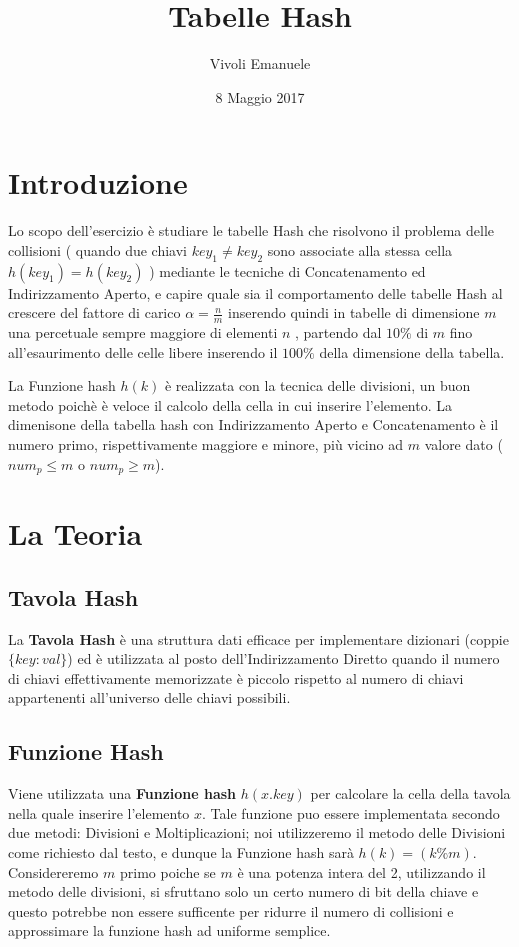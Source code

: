 \documentclass{article}
\title{Tabelle Hash}
\author{Vivoli Emanuele }
\date{8 Maggio 2017}
\makeatletter
\renewcommand\tableofcontents{%
    \@starttoc{toc}%
}
\makeatother
\begin{document}
\maketitle
\vspace*{0.33\textheight}
\tableofcontents

\newpage
\section{Introduzione}
Lo scopo dell'esercizio è studiare  le tabelle Hash che risolvono il problema delle collisioni ( quando due chiavi $key_1 \neq key_2$ sono associate alla stessa cella $h(key_1) = h(key_2)$ ) mediante le tecniche di Concatenamento ed Indirizzamento Aperto, e capire quale sia il comportamento delle tabelle Hash al crescere del fattore di carico $\alpha=\frac{n}{m}$ inserendo quindi in tabelle di dimensione $m$ una percetuale sempre maggiore di elementi $n$ , partendo dal $10\%$ di $m$ fino all'esaurimento delle celle libere inserendo il $100\%$ della dimensione della tabella.

La Funzione hash $h(k)$  è realizzata con la tecnica delle divisioni, un buon metodo poichè è veloce il calcolo della cella in cui inserire l'elemento.
La dimenisone della tabella hash con Indirizzamento Aperto e Concatenamento è il numero primo, rispettivamente maggiore e minore, più vicino ad $m$ valore dato ($num_p \leq m$ o $num_p \geq m$).

\newpage
\section{La Teoria}
\subsection{Tavola Hash}
La \textbf{Tavola Hash} è una struttura dati efficace per implementare dizionari (coppie $\{key : val\}$) ed è utilizzata al posto dell'Indirizzamento Diretto quando il numero di chiavi effettivamente memorizzate è piccolo rispetto al numero di chiavi appartenenti all'universo delle chiavi possibili.
\subsection{Funzione Hash}
Viene utilizzata una \textbf{Funzione hash} $h(x.key)$ per calcolare la cella della tavola nella quale inserire l'elemento $x$. Tale funzione puo essere implementata secondo due metodi: Divisioni e Moltiplicazioni; noi utilizzeremo il metodo delle Divisioni come richiesto dal testo, e dunque la Funzione hash sarà $h(k) = (k \% m)$.
Considereremo $m$ primo poiche se $m$ è una potenza intera del 2, utilizzando il metodo delle divisioni, si sfruttano solo un certo numero di bit della chiave e questo potrebbe non essere sufficente per ridurre il numero di collisioni e approssimare la funzione hash ad uniforme semplice.
\end{document}
